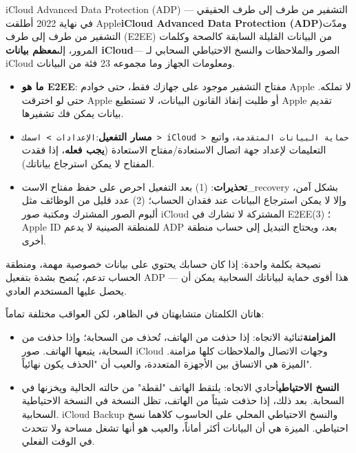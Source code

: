 \begin{tcbwarn}{iCloud Advanced Data Protection (ADP) — التشفير من طرف إلى طرف الحقيقي}
في نهاية 2022 أطلقت Apple\textbf{iCloud Advanced Data Protection (ADP)}ومدّت التشفير من طرف إلى طرف (E2EE) من البيانات القليلة السابقة كالصحة وكلمات المرور، إلى\textbf{معظم بيانات iCloud}— الصور والملاحظات والنسخ الاحتياطي السحابي لـ iCloud ومعلومات الجهاز وما مجموعه 23 فئة من البيانات.

\begin{itemize}
  \item \textbf{ما هو E2EE}: مفتاح التشفير موجود على جهازك فقط، حتى خوادم Apple لا تملكه. حتى لو اخترقت Apple أو طلبت إنفاذ القانون البيانات، لا تستطيع Apple تقديم بيانات يمكن فك تشفيرها.
  \item \textbf{مسار التفعيل}:\texttt{الإعدادات > اسمك > iCloud > حماية البيانات المتقدمة}، واتبع التعليمات لإعداد جهة اتصال الاستعادة/مفتاح الاستعادة (\textbf{يجب فعله}، إذا فقدت المفتاح لا يمكن استرجاع بياناتك).
  \item \textbf{تحذيرات}: (1) بعد التفعيل احرص على حفظ مفتاح الاست\_recovery بشكل آمن، وإلا لا يمكن استرجاع البيانات عند فقدان الحساب؛ (2) عدد قليل من الوظائف مثل ألبوم الصور المشترك ومكتبة صور iCloud المشتركة لا تشارك في E2EE؛ (3) Apple ID للمنطقة الصينية لا يدعم ADP بعد، ويحتاج التبديل إلى حساب منطقة أخرى.
\end{itemize}

نصيحة بكلمة واحدة: إذا كان حسابك يحتوي على بيانات خصوصية مهمة، ومنطقة الحساب تدعم، يُنصح بشدة بتفعيل ADP — هذا أقوى حماية لبياناتك السحابية يمكن أن يحصل عليها المستخدم العادي.

\end{tcbwarn}


هاتان الكلمتان متشابهتان في الظاهر، لكن العواقب مختلفة تماماً:

\begin{itemize}
  \item \textbf{المزامنة}ثنائية الاتجاه: إذا حذفت من الهاتف، تُحذف من السحابة؛ وإذا حذفت من السحابة، يتبعها الهاتف. صور iCloud وجهات الاتصال والملاحظات كلها مزامنة. الميزة هي الاتساق بين الأجهزة المتعددة، والعيب أن "الحذف يكون نهائياً".
  \item \textbf{النسخ الاحتياطي}أحادي الاتجاه: يلتقط الهاتف "لقطة" من حالته الحالية ويخزنها في السحابة. بعد ذلك، إذا حذفت شيئاً من الهاتف، تظل النسخة في النسخة الاحتياطية السحابية. iCloud Backup والنسخ الاحتياطي المحلي على الحاسوب كلاهما نسخ احتياطي. الميزة هي أن البيانات أكثر أماناً، والعيب هو أنها تشغل مساحة ولا تتحدث في الوقت الفعلي.
\end{itemize}

